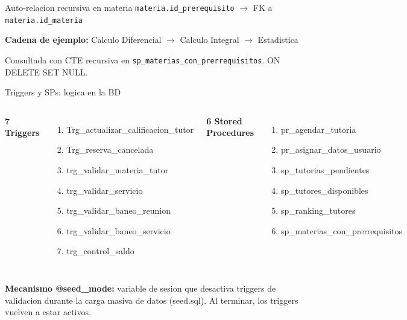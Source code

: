﻿\documentclass[11pt,aspectratio=169]{beamer}
\begin{document}
\begin{frame}{Auto-relacion recursiva en materia}
    \texttt{materia.id\_prerequisito} $\rightarrow$ FK a \texttt{materia.id\_materia}

    \vspace{0.2cm}
    \textbf{Cadena de ejemplo:} Calculo Diferencial $\rightarrow$ Calculo Integral $\rightarrow$ Estadistica

    \vspace{0.2cm}
    Consultada con CTE recursiva en \texttt{sp\_materias\_con\_prerrequisitos}. ON DELETE SET NULL.
\end{frame}

\begin{frame}{Triggers y SPs: logica en la BD}
    \begin{columns}
        \textbf{7 Triggers}
        \begin{enumerate}
            \footnotesize
            \item Trg\_actualizar\_calificacion\_tutor
            \item Trg\_reserva\_cancelada
            \item trg\_validar\_materia\_tutor
            \item trg\_validar\_servicio
            \item trg\_validar\_baneo\_reunion
            \item trg\_validar\_baneo\_servicio
            \item trg\_control\_saldo
        \end{enumerate}
        \textbf{6 Stored Procedures}
        \begin{enumerate}
            \footnotesize
            \item pr\_agendar\_tutoria
            \item pr\_asignar\_datos\_usuario
            \item sp\_tutorias\_pendientes
            \item sp\_tutores\_disponibles
            \item sp\_ranking\_tutores
            \item sp\_materias\_con\_prerrequisitos
        \end{enumerate}
    \end{columns}
    \vspace{0.2cm}
    \textbf{Mecanismo @seed\_mode:} variable de sesion que desactiva triggers de validacion durante la carga masiva de datos (seed.sql). Al terminar, los triggers vuelven a estar activos.
\end{frame}
\end{document}
